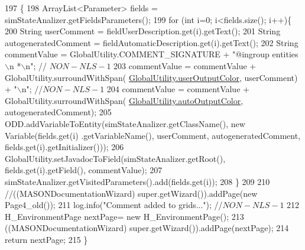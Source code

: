 \begin{DoxyCode}
197                                     \{ 
198         ArrayList<Parameter> fields = simStateAnalizer.getFieldsParameters();
199         \textcolor{keywordflow}{for} (\textcolor{keywordtype}{int} i=0; i<fields.size(); i++)\{
200             String userComment = fieldUserDescription.get(i).getText();
201             String autogeneratedComment = fieldAutomaticDescription.get(i).getText();
202             String commentValue = GlobalUtility.COMMENT\_SIGNATURE +  \textcolor{stringliteral}{"@ingroup entities\(\backslash\)n *\(\backslash\)n"}; \textcolor{comment}{//
      $NON-NLS-1$}
203             commentValue = commentValue + GlobalUtility.surroundWithSpan(
      \hyperlink{classit_1_1isislab_1_1masonassisteddocumentation_1_1mason_1_1analizer_1_1_global_utility_a0fcb324ae33eb93bd5b9177e342ecc82}{GlobalUtility.userOutputColor}, userComment) + \textcolor{stringliteral}{"\(\backslash\)n"}; \textcolor{comment}{//$NON-NLS-1$}
204             commentValue = commentValue + GlobalUtility.surroundWithSpan(
      \hyperlink{classit_1_1isislab_1_1masonassisteddocumentation_1_1mason_1_1analizer_1_1_global_utility_a2e086c8a2d8edf16b2eaf90408832adc}{GlobalUtility.autoOutputColor}, autogeneratedComment);
205             ODD.addVariableToEntity(simStateAnalizer.getClassName(), \textcolor{keyword}{new} Variable(fields.get(i)
      .getVariableName(), userComment, autogeneratedComment, fields.get(i).getInitializer()));
206             GlobalUtility.setJavadocToField(simStateAnalizer.getRoot(), fields.get(i).getField(), 
      commentValue);
207             simStateAnalizer.getVisitedParameters().add(fields.get(i));
208         \}
209 
210         \textcolor{comment}{//((MASONDocumentationWizard) super.getWizard()).addPage(new Page4\_old());}
211         log.info(\textcolor{stringliteral}{"Comment added to grids..."}); \textcolor{comment}{//$NON-NLS-1$}
212         H\_EnvironmentPage nextPage= \textcolor{keyword}{new} H\_EnvironmentPage();
213         ((MASONDocumentationWizard) super.getWizard()).addPage(nextPage); 
214         \textcolor{keywordflow}{return} nextPage; 
215     \}
\end{DoxyCode}
